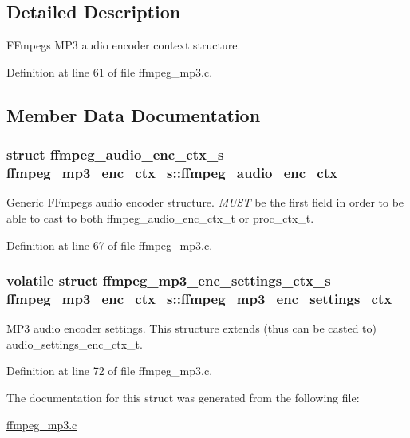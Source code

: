 \subsection{Detailed Description}
F\+Fmpeg\textquotesingle{}s M\+P3 audio encoder context structure. 

Definition at line 61 of file ffmpeg\+\_\+mp3.\+c.



\subsection{Member Data Documentation}
\subsubsection[{\texorpdfstring{ffmpeg\+\_\+audio\+\_\+enc\+\_\+ctx}{ffmpeg_audio_enc_ctx}}]{\setlength{\rightskip}{0pt plus 5cm}struct {\bf ffmpeg\+\_\+audio\+\_\+enc\+\_\+ctx\+\_\+s} ffmpeg\+\_\+mp3\+\_\+enc\+\_\+ctx\+\_\+s\+::ffmpeg\+\_\+audio\+\_\+enc\+\_\+ctx}\hypertarget{structffmpeg__mp3__enc__ctx__s_aadcbc8d7f34dd0577f8f1a1414419d64}{}\label{structffmpeg__mp3__enc__ctx__s_aadcbc8d7f34dd0577f8f1a1414419d64}
Generic F\+Fmpeg\textquotesingle{}s audio encoder structure. {\itshape M\+U\+ST} be the first field in order to be able to cast to both ffmpeg\+\_\+audio\+\_\+enc\+\_\+ctx\+\_\+t or proc\+\_\+ctx\+\_\+t. 

Definition at line 67 of file ffmpeg\+\_\+mp3.\+c.

\subsubsection[{\texorpdfstring{ffmpeg\+\_\+mp3\+\_\+enc\+\_\+settings\+\_\+ctx}{ffmpeg_mp3_enc_settings_ctx}}]{\setlength{\rightskip}{0pt plus 5cm}volatile struct {\bf ffmpeg\+\_\+mp3\+\_\+enc\+\_\+settings\+\_\+ctx\+\_\+s} ffmpeg\+\_\+mp3\+\_\+enc\+\_\+ctx\+\_\+s\+::ffmpeg\+\_\+mp3\+\_\+enc\+\_\+settings\+\_\+ctx}\hypertarget{structffmpeg__mp3__enc__ctx__s_ad1c00f0eb06b87b763f3a3f86d031a0b}{}\label{structffmpeg__mp3__enc__ctx__s_ad1c00f0eb06b87b763f3a3f86d031a0b}
M\+P3 audio encoder settings. This structure extends (thus can be casted to) audio\+\_\+settings\+\_\+enc\+\_\+ctx\+\_\+t. 

Definition at line 72 of file ffmpeg\+\_\+mp3.\+c.



The documentation for this struct was generated from the following file\+:\begin{DoxyCompactItemize}
\item 
\hyperlink{ffmpeg__mp3_8c}{ffmpeg\+\_\+mp3.\+c}\end{DoxyCompactItemize}

